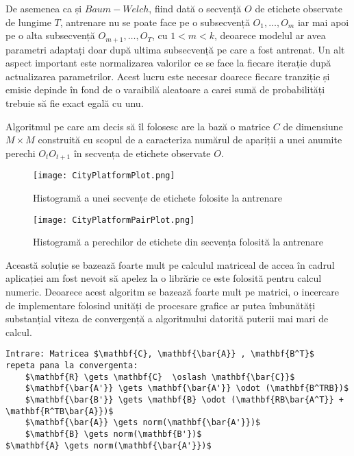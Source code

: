 De asemenea ca și $Baum-Welch$, fiind dată o secvență $O$ de etichete observate de lungime $T$, antrenare nu se poate face pe o subsecvență $O_{1},\dots,O_{m}$ iar mai apoi pe o alta subsecvență $O_{m+1},\dots,O_{T}$, cu $1 < m < k$, deoarece modelul ar avea parametri adaptați doar după ultima subsecvență pe care a fost antrenat. Un alt aspect important este normalizarea valorilor ce se face la fiecare iterație după actualizarea parametrilor. Acest lucru este necesar doarece fiecare tranziție și emisie depinde în fond de o varaibilă aleatoare a carei sumă de probabilități trebuie să fie exact egală cu unu.\par

Algoritmul pe care am decis să îl folosesc are la bază o matrice $C$ de dimensiune $M\times M$ construită cu scopul de a caracteriza numărul de apariții a unei anumite perechi $O_{t}O_{t+1}$ în secvența de etichete observate $O$.\par

\vspace{10mm}
\begin{figure}[H]
\centering
\texttt{[image: CityPlatformPlot.png]} \par
\caption{Histogramă a unei secvențe de etichete folosite la antrenare}
\end{figure}


\vspace{10mm}
\begin{figure}[H]
\centering
\texttt{[image: CityPlatformPairPlot.png]} \par
\caption{Histogramă a perechilor de etichete din secvența folosită la antrenare}
\end{figure}


Această soluție se bazează foarte mult pe calculul matriceal de accea în cadrul aplicației am fost nevoit să apelez la o librărie ce este folosită pentru calcul numeric. Deoarece acest algoritm se bazează foarte mult pe matrici, o incercare de implementare folosind unități de procesare grafice ar putea îmbunătăți substanțial viteza de convergență a algoritmului datorită puterii mai mari de calcul.\par

\begin{lstlisting}[mathescape=true, caption=Pseudocod ce descrie algoritmul de inferență]
Intrare: Matricea $\mathbf{C}, \mathbf{\bar{A}} , \mathbf{B^T}$
repeta pana la convergenta:
	$\mathbf{R} \gets \mathbf{C}  \oslash \mathbf{\bar{C}}$
	$\mathbf{\bar{A'}} \gets \mathbf{\bar{A'}} \odot (\mathbf{B^TRB})$
	$\mathbf{\bar{B'}} \gets \mathbf{B} \odot (\mathbf{RB\bar{A^T}} + \mathbf{R^TB\bar{A}})$
	$\mathbf{\bar{A}} \gets norm(\mathbf{\bar{A'}})$
	$\mathbf{B} \gets norm(\mathbf{B'})$
$\mathbf{A} \gets norm(\mathbf{\bar{A'}})$
\end{lstlisting}

